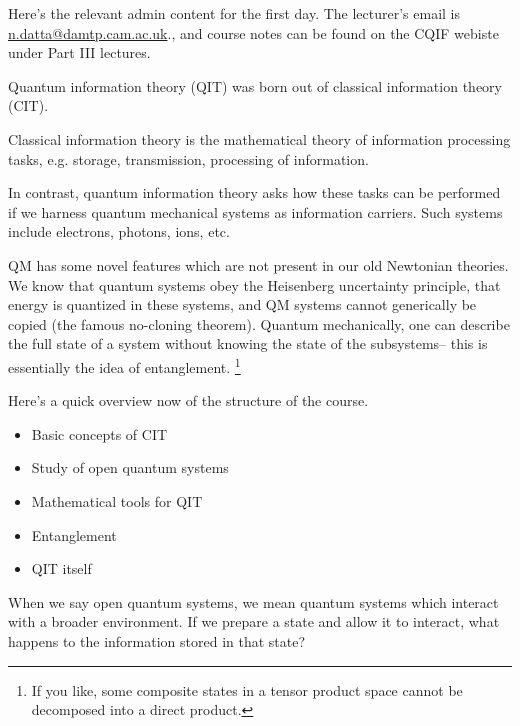 \begin{note}
    Here's the relevant admin content for the first day. The lecturer's email is \url{n.datta@damtp.cam.ac.uk}., and course notes can be found on the CQIF webiste under Part III lectures.
\end{note}

Quantum information theory (QIT) was born out of classical information theory (CIT).
\begin{defn}
Classical information theory is the mathematical theory of information processing tasks, e.g. storage, transmission, processing of information.
\end{defn}
In contrast, quantum information theory asks how these tasks can be performed if we harness quantum mechanical systems as information carriers. Such systems include electrons, photons, ions, etc.

QM has some novel features which are not present in our old Newtonian theories. We know that quantum systems obey the Heisenberg uncertainty principle, that energy is quantized in these systems, and QM systems cannot generically be copied (the famous no-cloning theorem).
Quantum mechanically, one can describe the full state of a system without knowing the state of the subsystems-- this is essentially the idea of entanglement.%
    \footnote{If you like, some composite states in a tensor product space cannot be decomposed into a direct product.}

Here's a quick overview now of the structure of the course.
\begin{itemize}
    \item Basic concepts of CIT
    \item Study of open quantum systems
    \item Mathematical tools for QIT
    \item Entanglement
    \item QIT itself
\end{itemize}
When we say open quantum systems, we mean quantum systems which interact with a broader environment. If we prepare a state and allow it to interact, what happens to the information stored in that state?

